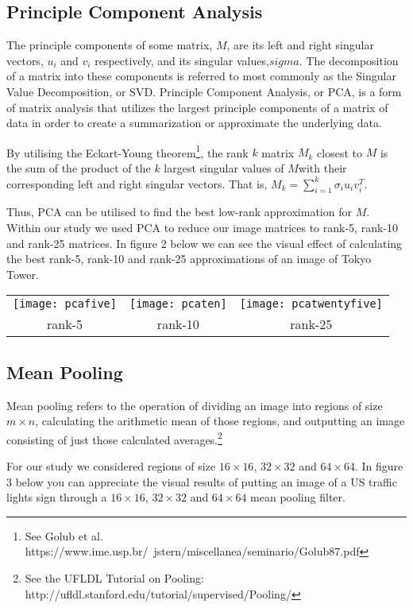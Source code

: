 \subsection{Principle Component Analysis}
The principle components of some matrix, $M$, are its left and right singular vectors, $u_i$ and $v_i$ respectively, and its singular values,$sigma$. The decomposition of a matrix into these components is referred to most commonly as the Singular Value Decomposition, or SVD.
Principle Component Analysis, or PCA, is a form of matrix analysis that utilizes the largest principle components of a matrix of data in order to create a summarization or approximate the underlying data.

By utilising the Eckart-Young theorem\footnote{See Golub et al. https://www.ime.usp.br/~jstern/miscellanea/seminario/Golub87.pdf}, the rank $k$ matrix $M_k$ closest to $M$ is the sum of the product of the $k$ largest singular values of $M$with their corresponding left and right singular vectors. That is, $M_k = \sum_{i=1}^k \sigma_i u_i v_i^T$.

Thus, PCA can be utilised to find the best low-rank approximation for $M$.
Within our study we used PCA to reduce our image matrices to rank-5, rank-10 and rank-25 matrices.
In figure 2 below we can see the visual effect of calculating the best rank-5, rank-10 and rank-25
approximations of an image of Tokyo Tower.

\vspace*{3mm}
\begin{tabular}{c c c}
	\texttt{[image: pcafive]} &
		\texttt{[image: pcaten]} &
		\texttt{[image: pcatwentyfive]} \\
	rank-5 & rank-10 & rank-25 \\
\end{tabular}

\subsection{Mean Pooling}
Mean pooling refers to the operation of dividing
an image into regions of size $m \times n$, calculating
the arithmetic mean of those regions, and outputting
an image consisting of just those calculated averages.\footnote{See the UFLDL Tutorial on Pooling: http://ufldl.stanford.edu/tutorial/supervised/Pooling/}

For our study we considered regions of size $16 \times 16$, $32 \times 32$ and $64 \times 64$.
In figure 3 below you can appreciate the visual results of putting an image of a US traffic lights sign through a $16 \times 16$,
$32 \times 32$ and $64 \times 64$ mean pooling filter.

